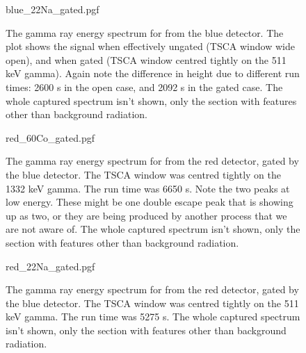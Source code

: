 \documentclass[11pt]{article}
\numberwithin{equation}{section}
\numberwithin{figure}{section}
\numberwithin{table}{section}
\begin{document}
\begin{figure}[H]
    \begin{center}
       {blue_22Na_gated.pgf}
       \caption{The gamma ray energy spectrum for  from the blue detector. The plot shows the signal when effectively ungated (TSCA window wide open), and when gated (TSCA window centred tightly on the 511 keV gamma). Again note the difference in height due to different run times: 2600 s in the open case, and 2092 s in the gated case. The whole captured spectrum isn't shown, only the section with features other than background radiation.}
       \label{fig:blue_22Na_gated}
    \end{center}
\end{figure}

\begin{figure}[H]
    \begin{center}
       {red_60Co_gated.pgf}
       \caption{The gamma ray energy spectrum for  from the red detector, gated by the blue detector. The TSCA window was centred tightly on the 1332 keV gamma. The run time was 6650 s. Note the two peaks at low energy. These might be one double escape peak that is showing up as two, or they are being produced by another process that we are not aware of. The whole captured spectrum isn't shown, only the section with features other than background radiation.}
       \label{fig:red_60Co_gated}
    \end{center}
\end{figure}

\begin{figure}[H]
    \begin{center}
       {red_22Na_gated.pgf}
       \caption{The gamma ray energy spectrum for  from the red detector, gated by the blue detector. The TSCA window was centred tightly on the 511 keV gamma. The run time was 5275 s. The whole captured spectrum isn't shown, only the section with features other than background radiation. }
       \label{fig:red_22Na_gated}
    \end{center}
\end{figure}
\end{document}
